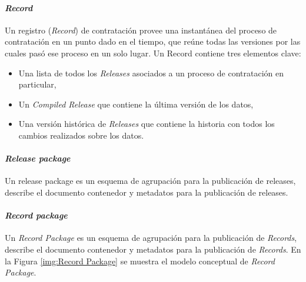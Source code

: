 \paragraph{\textit{Record}}\hfill \break
\label{record}
Un registro (\textit{Record}) de contratación provee una instantánea del proceso de contratación en un punto dado en el tiempo, que reúne todas las versiones por las cuales pasó ese proceso en un solo lugar.
Un Record contiene tres elementos clave: 
\begin{itemize}
    \item Una lista de todos los \textit{Releases} asociados a un proceso de contratación en particular, 
    \item Un \textit{Compiled Release} que contiene la última versión de los datos,
    \item Una versión histórica de \textit{Releases} que contiene la historia con todos los cambios realizados sobre los datos.
\end{itemize}

\paragraph{\textit{Release package}}\hfill \break
Un release package es un esquema de agrupación para la publicación de releases, describe el documento contenedor y metadatos para la publicación de releases.

\paragraph{\textit{Record package}}\hfill \break
Un \textit{Record Package} es un esquema de agrupación para la publicación de \textit{Records}, describe el documento contenedor y metadatos para la publicación de \textit{Records}. En la Figura \ref{img:Record Package} se muestra el modelo conceptual de \textit{Record Package}.



